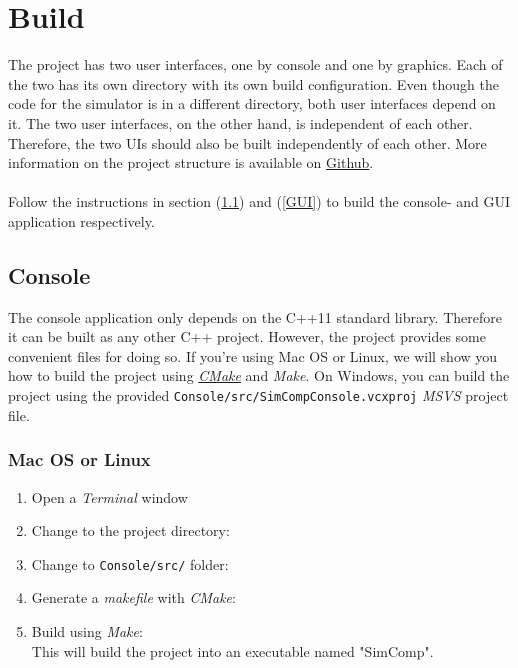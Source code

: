 \section{Build} \label{bygge}
The project has two user interfaces, one by console and one by graphics. Each of the two has its own directory with its own build configuration. Even though the code for the simulator is in a different directory, both user interfaces depend on it. The two user interfaces, on the other hand, is independent of each other. Therefore, the two UIs should also be built independently of each other. More information on the project structure is available on \href{https://github.com/LasseNatvig/SimComp}{Github}.
\\
\\
Follow the instructions in section (\ref{konsoll}) and (\ref{GUI}) to build the console- and GUI application respectively.

\subsection{Console} \label{konsoll}
The console application only depends on the C++11 standard library. Therefore it can be built as any other C++ project. However, the project provides some convenient files for doing so. If you're using Mac OS or Linux, we will show you how to build the project using \href{https://cmake.org}{\textit{CMake}} and \textit{Make}. On Windows, you can build the project using the provided \texttt{\textunderscore Console/\textunderscore src/SimComp\textunderscore Console.vcxproj} \textit{MSVS} project file.
%
\subsubsection{Mac OS or Linux}
\begin{enumerate}
    \item Open a \textit{Terminal} window
    \item Change to the project directory:
    \item Change to \texttt{\textunderscore Console/\textunderscore src/} folder:
    \item Generate a \textit{makefile} with \textit{CMake}:
    \item Build using \textit{Make}:
     \\
    This will build the project into an executable named "SimComp".
\end{enumerate}

